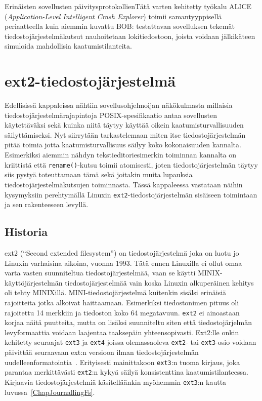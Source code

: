 Erinäisten sovellusten päivitysprotokollienTätä varten kehitetty työkalu ALICE (\emph{Application-Level Intelligent Crash Explorer}) toimii samantyyppisellä periaatteella kuin aiemmin kuvattu BOB:
testattavan sovelluksen tekemät tiedostojärjestelmäkutsut nauhoitetaan lokitiedostoon,
joista voidaan jälkikäteen simuloida mahdollisia kaatumistilanteita.

\section{ext2-tiedostojärjestelmä}
Edellisissä kappaleissa nähtiin sovellusohjelmoijan näkökulmasta millaisia tiedostojärjestelmärajapintoja POSIX-spesifikaatio antaa sovellusten käytettäväksi sekä kuinka niitä täytyy käyttää oikein kaatumisturvallisuuden säilyttämiseksi.
Nyt siirrytään tarkastelemaan miten itse tiedostojärjestelmän pitää toimia jotta kaatumisturvallisuus säilyy koko kokonaisuuden kannalta.
Esimerkiksi aiemmin nähdyn tekstieditoriesimerkin toiminnan kannalta on kriittistä että \texttt{rename()}-kutsu toimii atomisesti,
joten tiedostojärjestelmän täytyy siis pystyä toteuttamaan tämä sekä joitakin muita lupauksia tiedostojärjestelmäkutsujen toiminnasta.
Tässä kappaleessa vastataan näihin kysymyksiin perehtymällä Linuxin \texttt{ext2}-tiedostojärjestelmän sisäiseen toimintaan ja sen rakenteeseen levyllä.

\subsection{Historia}

ext2 (``Second extended filesystem'') on tiedostojärjestelmä joka on luotu jo Linuxin varhaisina aikoina, vuonna 1993.
Tätä ennen Linuxilla ei ollut omaa varta vasten suunniteltua tiedostojärjestelmää,
vaan se käytti MINIX-käyttöjärjestelmän tiedostojärjestelmää vain koska Linuxin alkuperäinen kehitys oli tehty MINIXillä.
MINI-tiedostojärjestelmä kuitenkin sisälsi erinäisiä rajoitteita jotka alkoivat haittaamaan.
Esimerkiksi tiedostonimen pituus oli rajoitettu 14 merkkiin ja tiedoston koko 64 megatavuun.
\texttt{ext2} ei ainoastaan korjaa näitä puutteita,
mutta on lisäksi suunniteltu siten että tiedostojärjelmän levyformaattia voidaan laajentaa taaksepäin yhteensopivasti.
Ext2:lle onkin kehitetty seuraajat \texttt{ext3} ja \texttt{ext4} joissa olemassaoleva \texttt{ext2}- tai \texttt{ext3}-osio voidaan päivittää seuraavaan
ext:n versioon ilman tiedostojärjestelmän uudelleenformatointia~\cite{Ext4Status}.
Erityisesti mainittakoon \texttt{ext3}:n tuoma kirjaus, joka parantaa merkittävästi \texttt{ext2}:n kykyä säilyä konsistenttina kaatumistilanteessa.
Kirjaavia tiedostojärjestelmiä käsitelläänkin myöhemmin \texttt{ext3}:n kautta luvussa~\ref{ChapJournallingFs}.

